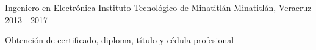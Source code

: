 


\begin{cventries}


\cventry
{Ingeniero en Electrónica} %
{Instituto Tecnológico de Minatitlán} %
{Minatitlán, Veracruz} %
{2013 - 2017} %
{ %
\begin{cvitems}
\item {Obtención de certificado, diploma, título y cédula profesional }
\end{cvitems}
}


\end{cventries}